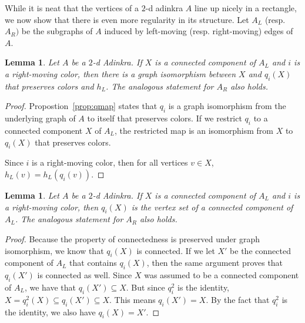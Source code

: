 \documentclass[12pt,twoside,singlespace]{article}
\numberwithin{equation}{section}
\newtheorem{lem}[equation]{Lemma}
\theoremstyle{definition}
\begin{document}
While it is neat that the vertices of a $2$-d adinkra $A$ line up nicely in a rectangle, we now show that there is even more regularity in its structure. Let $A_L$ (resp. $A_R)$ be the subgraphs of $A$ induced by left-moving (resp. right-moving) edges of $A$. %

\begin{lem}
\label{lem:qiso}
Let $A$ be a $2$-d Adinkra.  If $X$ is a connected component of $A_L$ and $i$ is a right-moving color, then there is a graph isomorphism between $X$ and $q_i(X)$ that preserves colors and $h_L$.  The analogous statement for $A_R$ also holds.
\end{lem}
\begin{proof}
Propostion~\ref{prop:qmap} states that $q_i$ is a graph isomorphism from the underlying graph of $A$ to itself that preserves colors.  If we restrict  $q_i$ to a connected component $X$ of $A_L$, the restricted map is an isomorphism from $X$ to $q_i(X)$ that preserves colors.

Since $i$ is a right-moving color, then for all vertices $v\in X$, $h_L(v)=h_L(q_i(v))$.
\end{proof}

\begin{lem}
\label{lem:qiconnected}
Let $A$ be a $2$-d Adinkra.  If $X$ is a connected component of $A_L$ and $i$ is a right-moving color, then $q_i(X)$ is the vertex set of a connected component of $A_L$. The analogous statement for $A_R$ also holds.
\end{lem}
\begin{proof}
Because the property of connectedness is preserved under graph isomorphism, we know that $q_i(X)$ is connected.  If we let $X'$ be the connected component of $A_L$ that contains $q_i(X)$, then the same argument proves that $q_i(X')$ is connected as well.  Since $X$ was assumed to be a connected component of $A_L$, we have that $q_i(X')\subseteq X$.  But since $q_i^2$ is the identity, $X=q_i^2(X)\subseteq q_i(X')\subseteq X$.  This means $q_i(X')=X$.  By the fact that $q_i^2$ is the identity, we also have $q_i(X)=X'$.
\end{proof}
\end{document}
